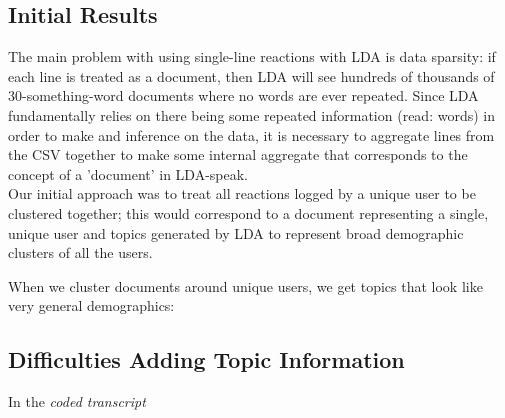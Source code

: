\subsection{Initial Results}
The main problem with using single-line reactions with LDA is data sparsity: if each line is treated as a document, then LDA will see hundreds of thousands of 30-something-word documents where no words are ever repeated. Since LDA fundamentally relies on there being some repeated information (read: words) in order to make and inference on the data, it is necessary to aggregate lines from the CSV together to make some internal aggregate that corresponds to the concept of a 'document' in LDA-speak.\\

Our initial approach was to treat all reactions logged by a unique user to be clustered together; this would correspond to a document representing a single, unique user and topics generated by LDA to represent broad demographic clusters of all the users.

When we cluster documents around unique users, we get topics that look like very general demographics:\\



\subsection{Difficulties Adding Topic Information}


In the \emph{coded transcript}


